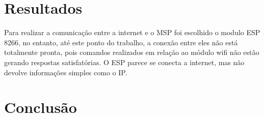 \documentclass[12pt,journal,compsoc]{IEEEtran}
\begin{document}
\section{Resultados}

Para realizar a comunicação entre a internet e o MSP foi escolhido o modulo ESP 8266, no entanto, até este ponto do trabalho, a conexão entre eles não está totalmente pronta, pois comandos realizados em relação ao módulo wifi não estão gerando respostas satisfatórias. O ESP parece se conecta a internet, mas não devolve informações simples como o IP.


\section{Conclusão}





\end{document}
